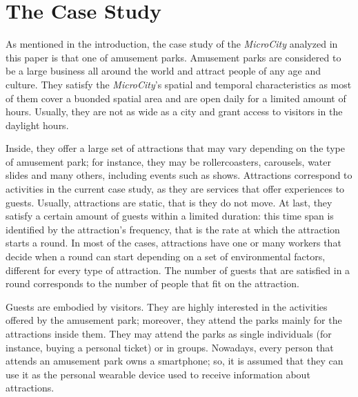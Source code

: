 \section{The Case Study}
\label{sec:case}

As mentioned in the introduction, the case study of the \textit{MicroCity} analyzed in this paper is that one of amusement parks. Amusement parks are considered to be a large business all around the world and attract people of any age and culture. They satisfy the \textit{MicroCity}'s spatial and temporal characteristics as most of them cover a buonded spatial area and are open daily for a limited amount of hours. Usually, they are not as wide as a city and grant access to visitors in the daylight hours.

Inside, they offer a large set of attractions that may vary depending on the type of amusement park; for instance, they may be rollercoasters, carousels, water slides and many others, including events such as shows. Attractions correspond to activities in the current case study, as they are services that offer experiences to guests. Usually, attractions are static, that is they do not move. At last, they satisfy a certain amount of guests within a limited duration: this time span is identified by the attraction's frequency, that is the rate at which the attraction starts a round. In most of the cases, attractions have one or many workers that decide when a round can start depending on a set of environmental factors, different for every type of attraction. The number of guests that are satisfied in a round corresponds to the number of people that fit on the attraction.

Guests are embodied by visitors. They are highly interested in the activities offered by the amusement park; moreover, they attend the parks mainly for the attractions inside them. They may attend the parks as single individuals (for instance, buying a personal ticket) or in groups. Nowadays, every person that attends an amusement park owns a smartphone; so, it is assumed that they can use it as the personal wearable device used to receive information about attractions.